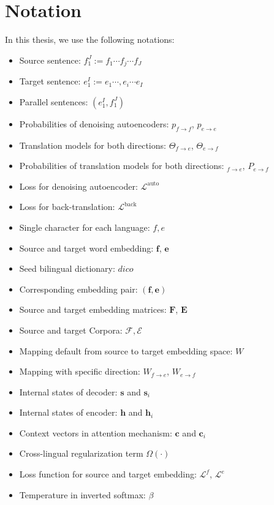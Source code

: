 \section{Notation}
In this thesis, we use the following notations:
\begin{itemize}
	\item Source sentence:  ${f_1^J:= f_1 \cdots  f_j \cdots f_J}$ 
	\item Target sentence:  ${e_1^I:= e_1 \cdots, e_i \cdots e_I}$
	\item Parallel sentences: $(e_1^I, f_1^J)$
	\item Probabilities of denoising autoencoders: $p_{f\rightarrow f}$, $p_{e\rightarrow e}$
	\item Translation models for both directions: $\Theta_{f\rightarrow e}$, $\Theta_{e \rightarrow f}$
	\item Probabilities of translation models for both directions: $_{f\rightarrow e}$, $P_{e\rightarrow f}$
	\item Loss for denoising autoencoder: $\mathcal{L}^{\text{auto}}$
	\item Loss for back-translation: $\mathcal{L}^{\text{back}}$
	\item Single character for each language: $f,e$ 
	\item Source and target word embedding: $\bm{f}$, $\bm{e}$
	\item Seed bilingual dictionary: $dico$ 
	\item Corresponding embedding pair: $(\bm{f}, \bm{e})$
	\item Source and target embedding matrices: $\bm{F}$, $\bm{E}$
	\item Source and target Corpora: $\mathcal{F}, \mathcal{E}$
	\item Mapping default from source to target embedding space: $W$
	\item Mapping with specific direction: $W_{f\rightarrow e}$, $W_{e\rightarrow f}$
	\item Internal states of decoder: $\bm{s}$ and $\bm{s}_i$  
	\item Internal states of encoder: $\bm{h}$ and $\bm{h}_i$ 
	\item Context vectors in attention mechanism: $\bm{c}$ and $\bm{c}_i$ 
	\item Cross-lingual regularization term $\Omega(\cdot)$
	\item Loss function for source and target embedding: $\mathcal{L}^f$, $\mathcal{L}^e$
	\item Temperature in inverted softmax: $\beta$ 

\end{itemize}
